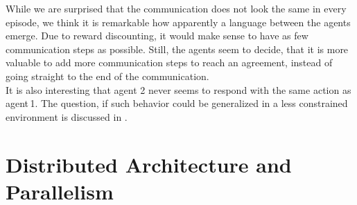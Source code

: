 While we are surprised that the communication does not look the same in every episode, we think it is remarkable how apparently a language between the agents emerge. Due to reward discounting, it would make sense to have as few communication steps as possible. Still, the agents seem to decide, that it is more valuable to add more communication steps to reach an agreement, instead of going straight to the end of the communication.\\
It is also interesting that agent 2 never seems to respond with the same action as agent\,1. The question, if such behavior could be generalized in a less constrained environment is discussed in .
\newpage
\section{Distributed Architecture and Parallelism}\label{dist_architecture}
